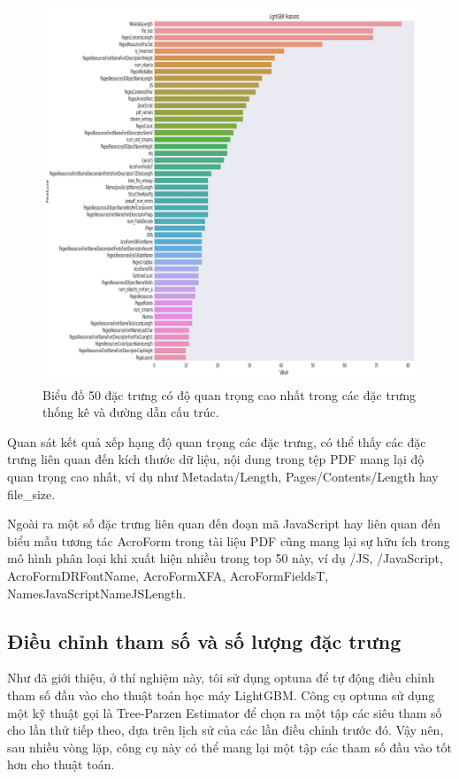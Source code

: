 \documentclass[./../main.tex]{subfiles}
\begin{document}
\begin{figure}[H]
	\centering
	\includegraphics[width=\linewidth]{./images/lgbm_importances-01.png}
	\caption{Biểu đồ 50 đặc trưng có độ quan trọng cao nhất trong các đặc trưng thống kê và đường dẫn cấu trúc.}
	\label{fig:lgbm_importances}
\end{figure}

Quan sát kết quả xếp hạng độ quan trọng các đặc trưng, có thể thấy các đặc trưng liên quan đến kích thước dữ liệu, nội dung trong tệp PDF mang lại độ quan trọng cao nhất, ví dụ như Metadata\slash Length, Pages\slash Contents\slash Length hay file\_size.

Ngoài ra một số đặc trưng liên quan đến đoạn mã JavaScript hay liên quan đến biểu mẫu tương tác AcroForm trong tài liệu PDF cũng mang lại sự hữu ích trong mô hình phân loại khi xuất hiện nhiều trong top 50 này, ví dụ \slash JS, \slash JavaScript, AcroFormDRFontName, AcroFormXFA, AcroFormFieldsT, NamesJavaScriptNameJSLength.

\subsection{Điều chỉnh tham số và số lượng đặc trưng}

Như đã giới thiệu, ở thí nghiệm này, tôi sử dụng optuna để tự động điều chỉnh tham số đầu vào cho thuật toán học máy LightGBM. Công cụ optuna sử dụng một kỹ thuật gọi là Tree-Parzen Estimator \cite{optuna} để chọn ra một tập các siêu tham số cho lần thử tiếp theo, dựa trên lịch sử của các lần điều chỉnh trước đó. Vậy nên, sau nhiều vòng lặp, công cụ này có thể mang lại một tập các tham số đầu vào tốt hơn cho thuật toán.
\end{document}
